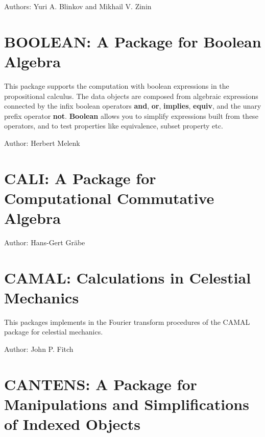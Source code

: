 Authors: Yuri A. Blinkov and Mikhail V. Zinin



\newpage

\section{BOOLEAN: A Package for Boolean Algebra}

This package supports the computation with boolean expressions in the
propositional calculus.  The data objects are composed from algebraic
expressions connected by the infix boolean operators \textbf{and}, \textbf{or},
\textbf{implies}, \textbf{equiv}, and the unary prefix operator \textbf{not}.
\textbf{Boolean} allows you to simplify expressions built from these
operators, and to test properties like equivalence, subset property etc.

Author: Herbert Melenk



\newpage

\section{CALI: A Package for Computational Commutative Algebra}

\iffalse
This package contains algorithms for computations in commutative algebra
closely related to the Gr\"obner algorithm for ideals and modules.  Its
heart is a new implementation of the Gr\"obner algorithm that also allows
for the computation of syzygies.  This implementation is also applicable to
submodules of free modules with generators represented as rows of a matrix.
\fi
Author: Hans-Gert Gr\"abe



\newpage

\section{CAMAL: Calculations in Celestial Mechanics}
\label{CAMAL}

This packages implements in \REDUCE the Fourier transform procedures of the
CAMAL package for celestial mechanics.

Author: John P. Fitch



\newpage

\section{CANTENS: A Package for Manipulations
and Simplifications of Indexed Objects}

